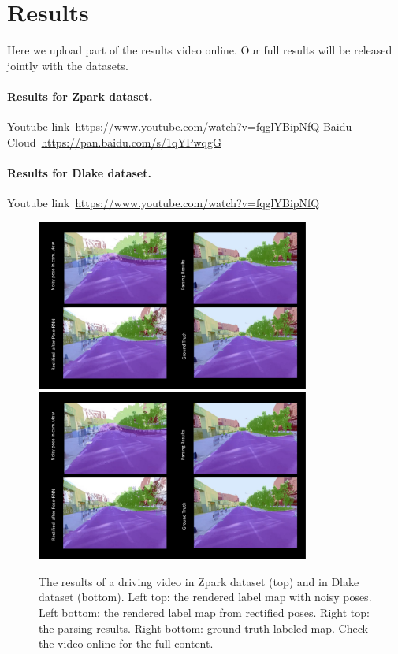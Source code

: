 \documentclass[10pt,twocolumn,letterpaper]{article}
\begin{document}
\section{Results} 
Here we upload part of the results video online. Our full results will be released jointly with the datasets.

\paragraph{Results for Zpark dataset.}

Youtube link~\url{https://www.youtube.com/watch?v=fqglYBipNfQ}
Baidu Cloud~\url{https://pan.baidu.com/s/1qYPwqgG}

\paragraph{Results for Dlake dataset.} 
Youtube link~\url{https://www.youtube.com/watch?v=fqglYBipNfQ}



\begin{figure}[!hbpt]
\center
\includegraphics[width=0.8\textwidth]{fig/results_video.pdf}
\includegraphics[width=0.8\textwidth]{fig/results_video.pdf}
\caption{The results of a driving video in Zpark dataset (top) and in Dlake dataset (bottom). Left top: the rendered label map with noisy poses. Left bottom: the rendered label map from rectified poses. Right top: the parsing results. Right bottom: ground truth labeled map. Check the video online for the full content.}
\label{fig:framework}
\end{figure}

% 
% 
\end{document}
